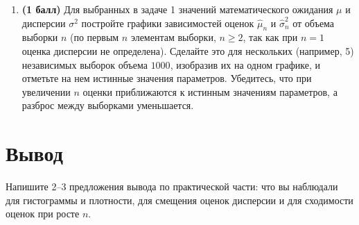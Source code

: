 \documentclass[a4paper,12pt]{article}
\newcommand{\pts}[1]{\textbf{(#1)}}
\begin{document}
\begin{enumerate}
  \item \pts{1 балл} Для выбранных в задаче 1 значений математического ожидания $\mu$ и дисперсии $\sigma^2$ постройте графики зависимостей оценок $\hat{\mu}_n$ и $\hat{\sigma}_n^2$ от объема выборки $n$ (по первым $n$ элементам выборки, $n\ge2$, так как при $n=1$ оценка дисперсии не определена). Сделайте это для нескольких (например, 5) независимых выборок объема $1000$, изобразив их на одном графике, и отметьте на нем истинные значения параметров. Убедитесь, что при увеличении $n$ оценки приближаются к истинным значениям параметров, а разброс между выборками уменьшается.

\end{enumerate}

\section*{Вывод}

Напишите 2--3 предложения вывода по практической части: что вы наблюдали для гистограммы и плотности, для смещения оценок дисперсии и для сходимости оценок при росте $n$.
\end{document}
